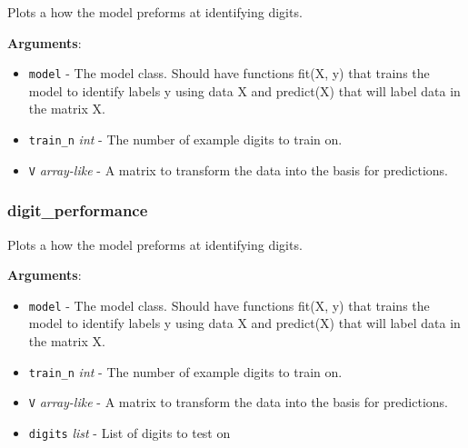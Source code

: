 \begin{Shaded}
\begin{Highlighting}[]
\end{Highlighting}
\end{Shaded}

Plots a how the model preforms at identifying digits.

\textbf{Arguments}:

\begin{itemize}
\tightlist
\item
  \texttt{model} - The model class. Should have functions fit(X, y) that
  trains the model to identify labels y using data X and predict(X) that
  will label data in the matrix X.
\item
  \texttt{train\_n} \emph{int} - The number of example digits to train
  on.
\item
  \texttt{V} \emph{array-like} - A matrix to transform the data into the
  basis for predictions.
\end{itemize}

\subsubsection{digit\_performance}

\begin{Shaded}
\begin{Highlighting}[]
\end{Highlighting}
\end{Shaded}

Plots a how the model preforms at identifying digits.

\textbf{Arguments}:

\begin{itemize}
\tightlist
\item
  \texttt{model} - The model class. Should have functions fit(X, y) that
  trains the model to identify labels y using data X and predict(X) that
  will label data in the matrix X.
\item
  \texttt{train\_n} \emph{int} - The number of example digits to train
  on.
\item
  \texttt{V} \emph{array-like} - A matrix to transform the data into the
  basis for predictions.
\item
  \texttt{digits} \emph{list} - List of digits to test on
\end{itemize}

